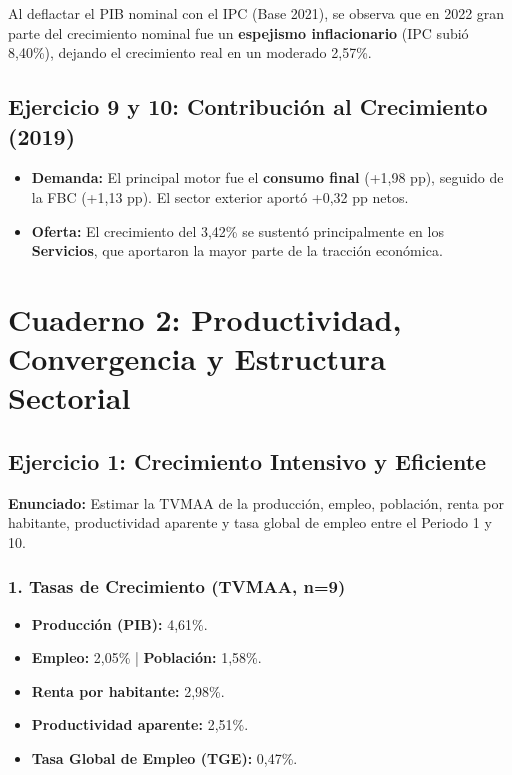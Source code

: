 Al deflactar el PIB nominal con el IPC (Base 2021), se observa que en 2022 gran parte del crecimiento nominal fue un \textbf{espejismo inflacionario} (IPC subió 8,40\%), dejando el crecimiento real en un moderado 2,57\%.

\subsection{Ejercicio 9 y 10: Contribución al Crecimiento (2019)}

\begin{itemize}
    \item \textbf{Demanda:} El principal motor fue el \textbf{consumo final} (+1,98 pp), seguido de la FBC (+1,13 pp). El sector exterior aportó +0,32 pp netos.
    \item \textbf{Oferta:} El crecimiento del 3,42\% se sustentó principalmente en los \textbf{Servicios}, que aportaron la mayor parte de la tracción económica.
\end{itemize}

\section{Cuaderno 2: Productividad, Convergencia y Estructura Sectorial}

\subsection{Ejercicio 1: Crecimiento Intensivo y Eficiente}

\textbf{Enunciado:} Estimar la TVMAA de la producción, empleo, población, renta por habitante, productividad aparente y tasa global de empleo entre el Periodo 1 y 10.

\subsubsection{1. Tasas de Crecimiento (TVMAA, n=9)}
\begin{itemize}
    \item \textbf{Producción (PIB):} 4,61\%.
    \item \textbf{Empleo:} 2,05\% | \textbf{Población:} 1,58\%.
    \item \textbf{Renta por habitante:} 2,98\%.
    \item \textbf{Productividad aparente:} 2,51\%.
    \item \textbf{Tasa Global de Empleo (TGE):} 0,47\%.
\end{itemize}

